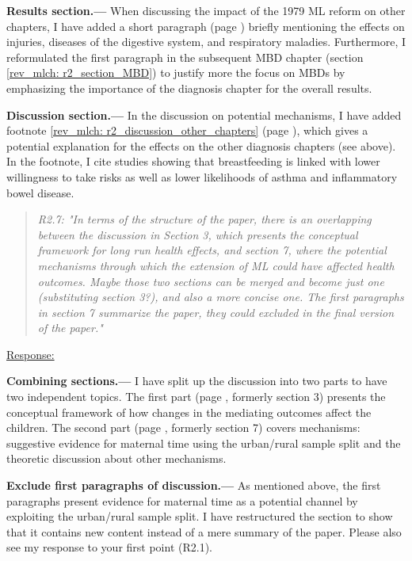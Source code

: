 \textbf{Results section.---} When discussing the impact of the 1979 ML reform on other chapters, I have added a short paragraph (page \pageref{rev_mlch: r2_results_other chapters}) briefly mentioning the effects on injuries, diseases of the digestive system, and respiratory maladies. Furthermore, I reformulated the first paragraph in the subsequent MBD chapter (section \ref{rev_mlch: r2_section_MBD}) to justify more the focus on MBDs by emphasizing the importance of the diagnosis chapter for the overall results.

\textbf{Discussion section.---} In the discussion on potential mechanisms, I have added footnote \ref{rev_mlch: r2_discussion_other_chapters} (page \pageref{rev_mlch: r2_discussion_other_chapters}), which gives a potential explanation for the effects on the other diagnosis chapters (see above). In the footnote, I cite studies showing that breastfeeding is linked with lower willingness to take risks as well as lower likelihoods of asthma and inflammatory bowel disease.



\bigskip
{}
\begin{quote}
	\textit{R2.7: "In terms of the structure of the paper, there is an overlapping between the discussion in Section 3, which presents the conceptual framework for long run health effects, and section 7, where the potential mechanisms through which the extension of ML could have affected health outcomes. Maybe those two sections can be merged and become just one (substituting section 3?), and also a more concise one. The first paragraphs in section 7 summarize the paper, they could excluded in the final version of the paper."}
\end{quote}
\underline{Response:} 

\textbf{Combining sections.---} I have split up the discussion into two parts to have two independent topics. The first part (page \pageref{rev_mlch: restructure_discussion_framework}, formerly section 3) presents the conceptual framework of how changes in the mediating outcomes affect the children. The second part (page \pageref{ref_mlch: discussion_mechanisms}, formerly section 7) covers mechanisms: suggestive evidence for maternal time using the urban/rural sample split and the theoretic discussion about other mechanisms.



\textbf{Exclude first paragraphs of discussion.---} As mentioned above, the first paragraphs present evidence for maternal time as a potential channel by exploiting the urban/rural sample split. I have restructured the section to show that it contains new content instead of a mere summary of the paper. Please also see my response to your first point (R2.1).

 

